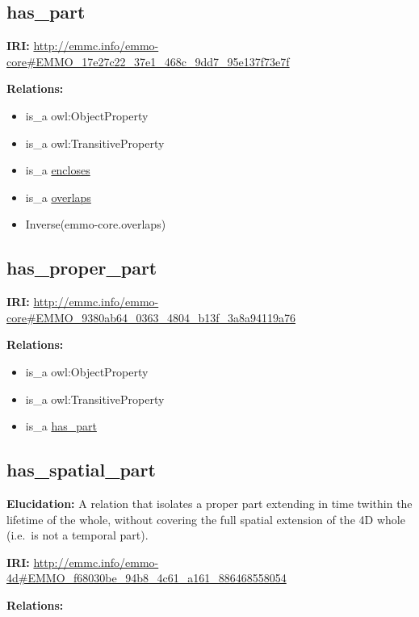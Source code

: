 \documentclass[a4paper,]{report}
\providecommand{\tightlist}{%
  \setlength{\itemsep}{0pt}\setlength{\parskip}{0pt}}
\begin{document}
\hypertarget{has_part}{%
\subsection{has\_part}\label{has_part}}

\textbf{IRI:}
\url{http://emmc.info/emmo-core\#EMMO_17e27c22_37e1_468c_9dd7_95e137f73e7f}

\textbf{Relations:}

\begin{itemize}
\tightlist
\item
  is\_a owl:ObjectProperty
\item
  is\_a owl:TransitiveProperty
\item
  is\_a \protect\hyperlink{encloses}{encloses}
\item
  is\_a \protect\hyperlink{overlaps}{overlaps}
\item
  Inverse(emmo-core.overlaps)
\end{itemize}

\hypertarget{has_proper_part}{%
\subsection{has\_proper\_part}\label{has_proper_part}}

\textbf{IRI:}
\url{http://emmc.info/emmo-core\#EMMO_9380ab64_0363_4804_b13f_3a8a94119a76}

\textbf{Relations:}

\begin{itemize}
\tightlist
\item
  is\_a owl:ObjectProperty
\item
  is\_a owl:TransitiveProperty
\item
  is\_a \protect\hyperlink{has_part}{has\_part}
\end{itemize}

\hypertarget{has_spatial_part}{%
\subsection{has\_spatial\_part}\label{has_spatial_part}}

\textbf{Elucidation:} A relation that isolates a proper part extending
in time twithin the lifetime of the whole, without covering the full
spatial extension of the 4D whole (i.e.~is not a temporal part).

\textbf{IRI:}
\url{http://emmc.info/emmo-4d\#EMMO_f68030be_94b8_4c61_a161_886468558054}

\textbf{Relations:}
\end{document}
